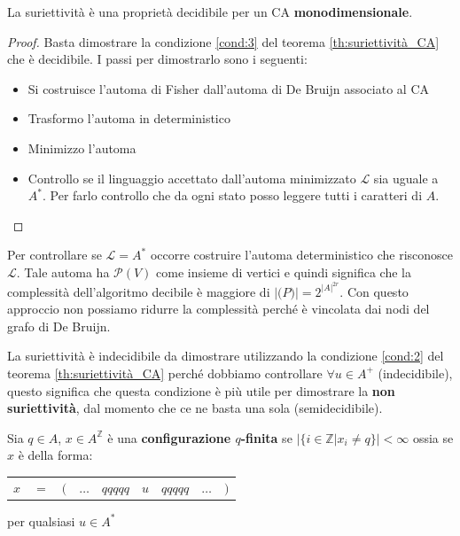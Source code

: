 \begin{teorema}
    La suriettività è una proprietà decidibile per un CA \textbf{monodimensionale}.
    \begin{proof}
        Basta dimostrare la condizione \ref{cond:3} del teorema \ref{th:suriettività_CA}
        che è decidibile. I passi per dimostrarlo sono i seguenti:
        \begin{itemize}
            \item Si costruisce l'automa di Fisher dall'automa di De Bruijn associato al CA
            \item Trasformo l'automa in deterministico
            \item Minimizzo l'automa
            \item Controllo se il linguaggio accettato dall'automa minimizzato $\mathcal{L}$ sia 
            uguale a $A^\ast$. Per farlo controllo che da ogni stato posso leggere 
            tutti i caratteri di $A$.
        \end{itemize}
    \end{proof}
\end{teorema}
\begin{nota}
    Per controllare se $\mathcal{L} = A^\ast$ occorre costruire l'automa deterministico 
    che risconosce $ \mathcal{L}$. Tale automa ha $\mathcal{P}(V)$ come insieme di 
    vertici e quindi significa che la complessità dell'algoritmo decibile è maggiore
    di $|\mathcal(P)| = 2^{|A|^{2r}}$. Con questo approccio non possiamo ridurre
    la complessità perché è vincolata dai nodi del grafo di De Bruijn.
\end{nota}

\begin{nota}
    La suriettività è indecidibile da dimostrare utilizzando la condizione \ref{cond:2} 
    del teorema \ref{th:suriettività_CA} perché dobbiamo controllare $\forall u \in A^+$ (indecidibile),
    questo significa che questa condizione è più utile per dimostrare la \textbf{non 
    suriettività}, dal momento che ce ne basta una sola (semidecidibile). 
\end{nota}

\begin{definizione}
    Sia $q\in A$, $x\in A^\mathbb{Z}$ è una \textbf{configurazione $q$-finita}
    se $|\{i\in \mathbb{Z}| x_i\ne q\}|< \infty$ ossia se $x$ è della forma:
    \begin{table}[!h]
        \centering
        \begin{tabular}{ccccccccc}
            $x$    & $=$ & $($ & $\dots$ & $qqqqq$ & $u$     & $qqqqq$ & $\dots$ & $)$ \\
        \end{tabular}
    \end{table}
    per qualsiasi $u\in A^\ast$
\end{definizione}

